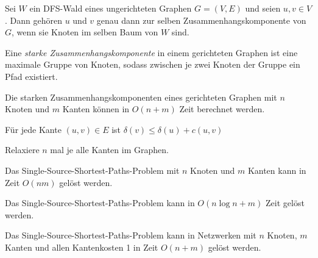 \documentclass{cheat-sheet}
\begin{document}

\begin{satz}
  Sei $W$ ein DFS-Wald eines ungerichteten Graphen $G = (V, E)$ und seien $u, v \in V$. Dann gehören $u$ und $v$ genau dann zur selben Zusammenhangskomponente von $G$, wenn sie Knoten im selben Baum von $W$ sind.
\end{satz}

\begin{defn}
  Eine \emph{starke Zusammenhangskomponente} in einem gerichteten Graphen ist eine maximale Gruppe von Knoten, sodass zwischen je zwei Knoten der Gruppe ein Pfad existiert.
\end{defn}

\begin{satz}
  Die starken Zusammenhangskomponenten eines gerichteten Graphen mit $n$ Knoten und $m$ Kanten können in $O(n+m)$ Zeit berechnet werden.
\end{satz}




\begin{lem}
  Für jede Kante $(u, v) \in E$ ist $\delta(v) \leq \delta(u) + c(u, v)$
\end{lem}

\begin{alg}
  Relaxiere $n$ mal je alle Kanten im Graphen.
\end{alg}

\begin{satz}
  Das Single-Source-Shortest-Paths-Problem mit $n$ Knoten und $m$ Kanten kann in Zeit $O(nm)$ gelöst werden.
\end{satz}

\begin{satz}
  Das Single-Source-Shortest-Paths-Problem kann in $O(n \log n + m)$ Zeit gelöst werden.
\end{satz}

\begin{satz}
  Das Single-Source-Shortest-Paths-Problem kann in Netzwerken mit $n$ Knoten, $m$ Kanten und allen Kantenkosten 1 in Zeit $O(n+m)$ gelöst werden.
\end{satz}
\end{document}
